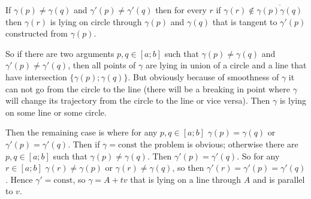 \documentclass[12pt,a4paper]{article}
\newcommand{\const}{\mathrm{const}}
\begin{document}
\begin{problem}{60}
        \begin{corollary}
            If $\gamma(p) \neq \gamma(q)$ and $\gamma'(p) \neq \gamma'(q)$ then for every $r$ if $\gamma(r) \notin \overline{\gamma(p) \gamma(q)}$ then $\gamma(r)$ is lying on circle through $\gamma(p)$ and $\gamma(q)$ that is tangent to $\gamma'(p)$ constructed from $\gamma(p)$. 
        \end{corollary}

        So if there are two arguments $p, q \in [a; b]$ such that $\gamma(p) \neq \gamma(q)$ and $\gamma'(p) \neq \gamma'(q)$, then all points of $\gamma$ are lying in union of a circle and a line that have intersection $\{\gamma(p); \gamma(q)\}$. But obviously because of smoothness of $\gamma$ it can not go from the circle to the line (there will be a breaking in point where $\gamma$ will change its trajectory from the circle to the line or vice versa). Then $\gamma$ is lying on some line or some circle.

        Then the remaining case is where for any $p, q \in [a; b]$ $\gamma(p) = \gamma(q)$ or $\gamma'(p) = \gamma'(q)$. Then if $\gamma = \const$ the problem is obvious; otherwise there are $p, q \in [a; b]$ such that $\gamma(p) \neq \gamma(q)$. Then $\gamma'(p) = \gamma'(q)$. So for any $r \in [a; b]$ $\gamma(r) \neq \gamma(p)$ or $\gamma(r) \neq \gamma(q)$, so then $\gamma'(r) = \gamma'(p) = \gamma'(q)$. Hence $\gamma' = \const$, so $\gamma = A + tv$ that is lying on a line through $A$ and is parallel to $v$.
    \end{problem}
\end{document}
